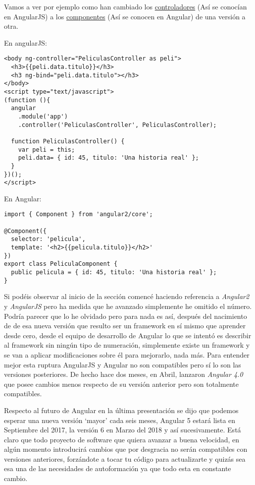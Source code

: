  Vamos a ver por ejemplo como han cambiado los \underline{controladores} (Así se conocían en AngularJS) a los \underline{componentes} (Así se conocen en Angular) de una versión a otra.
 
 En angularJS:
 
 \lstset{breaklines=true, basicstyle=\footnotesize}
\begin{lstlisting}[frame=single]
<body ng-controller="PeliculasController as peli">  
  <h3>{{peli.data.titulo}}</h3>
  <h3 ng-bind="peli.data.titulo"></h3>
</body>  
<script type="text/javascript">  
(function (){
  angular
    .module('app')
    .controller('PeliculasController', PeliculasController);
 
  function PeliculasController() {
    var peli = this;
    peli.data= { id: 45, titulo: 'Una historia real' };
  }
})();
</script> 
\end{lstlisting}

En Angular:
 \lstset{breaklines=true, basicstyle=\footnotesize}
\begin{lstlisting}[frame=single]
import { Component } from 'angular2/core';
 
@Component({
  selector: 'pelicula',
  template: '<h2>{{pelicula.titulo}}</h2>'
})
export class PeliculaComponent {  
  public pelicula = { id: 45, titulo: 'Una historia real' };
}
\end{lstlisting}

Si podéis observar al inicio de la sección comencé haciendo referencia a \emph{Angular2} y \emph{AngularJS} pero ha medida que he avanzado simplemente he omitido el número. Podría parecer que lo he olvidado pero para nada es así, después del nacimiento de de esa nueva versión que resulto ser un framework en sí mismo que aprender desde cero, desde el equipo de desarrollo de Angular lo que se intentó es describir al framework sin ningún tipo de numeración, simplemente existe un framework y se van a aplicar modificaciones sobre él para mejorarlo, nada más. Para entender mejor esta ruptura AngularJS y Angular no son compatibles pero sí lo son las versiones posteriores. De hecho hace dos meses, en Abril, lanzaron  \emph{Angular  4.0 }   que posee cambios menos respecto de su versión anterior pero son totalmente compatibles.




Respecto al futuro de Angular en la última presentación se dijo  que podemos esperar una nueva versión ‘mayor’ cada seis meses, Angular 5 estará lista en Septiembre del 2017, la versión 6 en Marzo del 2018 y así sucesivamente. Está claro que todo proyecto de software que quiera avanzar a buena velocidad, en algún momento introducirá cambios que por desgracia no serán compatibles con versiones anteriores, forzándote a tocar tu código para actualizarte y quizás sea esa una de las necesidades de autoformación ya que todo esta en constante cambio. 

